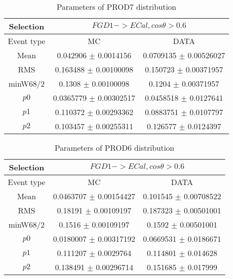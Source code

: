 \documentclass[a4paper,12pt]{article}
\begin{document}
\begin{table}[htbp]
\begin{center}
\begin{tabular}{|c|c|c|}
        \hline
        Selection & \multicolumn{2}{|c|}{$FGD1->ECal, cos\theta>0.6$}  \\ \hline
        Event type & MC & DATA \\ 
        \hline
        Mean & 0.042906 $\pm$ 0.0014156 & 0.0709135 $\pm$ 0.00526027 \\ 
        \hline 
        RMS & 0.163488 $\pm$ 0.00100098 & 0.150723 $\pm$ 0.00371957 \\ 
        \hline 
        minW68/2 & 0.1308 $\pm$ 0.00100098 & 0.1204 $\pm$ 0.00371957 \\ 
        \hline 
        $p0$ & 0.0365779 $\pm$ 0.00302517 & 0.0458518 $\pm$ 0.0127641 \\ 
        \hline 
        $p1$ & 0.110372 $\pm$ 0.00293362 & 0.0883751 $\pm$ 0.0107797 \\ 
        \hline 
        $p2$ & 0.103457 $\pm$ 0.00255311 & 0.126577 $\pm$ 0.0124397 \\ 
        \hline 
\end{tabular}
\caption{Parameters of PROD7 distribution } \vspace{0.2in}
\label{xxx}
\end{center}
\end{table}
\begin{table}[htbp]
\begin{center}
\begin{tabular}{|c|c|c|}
        \hline
        Selection & \multicolumn{2}{|c|}{$FGD1->ECal, cos\theta>0.6$}  \\ \hline
        Event type & MC & DATA \\ 
        \hline
        Mean & 0.0463707 $\pm$ 0.00154427 & 0.101545 $\pm$ 0.00708522 \\ 
        \hline 
        RMS & 0.18191 $\pm$ 0.00109197 & 0.187323 $\pm$ 0.00501001 \\ 
        \hline 
        minW68/2 & 0.1516 $\pm$ 0.00109197 & 0.1592 $\pm$ 0.00501001 \\ 
        \hline 
        $p0$ & 0.0180007 $\pm$ 0.00317192 & 0.0669531 $\pm$ 0.0186671 \\ 
        \hline 
        $p1$ & 0.111207 $\pm$ 0.0029764 & 0.114801 $\pm$ 0.014628 \\ 
        \hline 
        $p2$ & 0.138491 $\pm$ 0.00296714 & 0.151685 $\pm$ 0.017999 \\ 
        \hline 
\end{tabular}
\caption{Parameters of PROD6 distribution } \vspace{0.2in}
\label{xxx}
\end{center}
\end{table}
\end{document}

